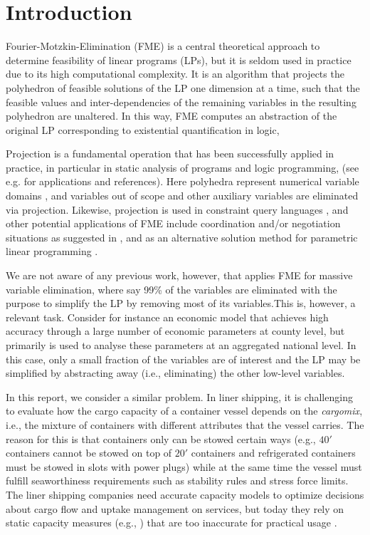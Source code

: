 
\section{Introduction}

Fourier-Motzkin-Elimination (FME) is a central theoretical approach to determine feasibility of linear programs (LPs), but it is seldom used in practice due to its high computational complexity.
%
It is an algorithm that projects the polyhedron of feasible solutions of the LP one dimension at a time, such that the feasible values and inter-dependencies of the remaining variables in the resulting polyhedron are unaltered. In this way, FME computes an abstraction of the original LP corresponding to existential quantification in logic, 

Projection is a fundamental operation that has been successfully applied in practice, in particular in static analysis of programs and logic programming,
(see e.g. \cite{benoy05} for applications and references). Here polyhedra represent 
numerical variable domains \cite{cousot78}, and variables out of scope and other auxiliary variables are eliminated via projection. Likewise, projection is used in constraint query languages \cite{lassez90}, and other potential applications of FME include %
coordination and/or negotiation situations as suggested in \cite{lukatskii08}, and as an alternative solution method for parametric linear programming \cite{jones08}.

We are not aware of any previous work, however, that applies FME for massive variable elimination, where say 99\% of the variables are eliminated with the purpose to simplify the LP by removing most of its variables.This is, however, a relevant task. Consider for instance an economic model that achieves high accuracy through a large number of economic parameters at county level, but primarily is used to analyse these parameters at an aggregated national level. In this case, only a small fraction of the variables are of interest and the LP may be simplified by abstracting away (i.e., eliminating) the other low-level variables.

In this report, we consider a similar problem. In liner shipping, it is challenging to evaluate how the cargo capacity of a container vessel depends on the {\em cargomix}, i.e., the mixture of containers with different attributes that the vessel carries. The reason for this is that containers only can be stowed certain ways (e.g., $40'$ containers cannot be stowed on top of $20'$ containers and refrigerated containers must be stowed in slots with power plugs) while at the same time the vessel must fulfill seaworthiness requirements such as stability rules and stress force limits. The liner shipping companies need accurate capacity models to optimize decisions about cargo flow and uptake management on services, but today they rely on static capacity measures (e.g., \cite{ting04,feng08,zurheide13}) that are too inaccurate for practical usage \cite{AlbertosThesis}.

